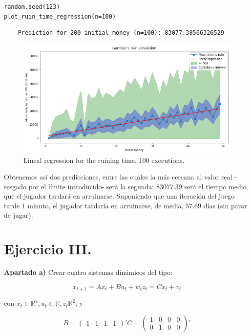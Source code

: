 \documentclass[a4paper]{article}
\newcommand{\R}{\mathbb{R}}
\begin{document}
\begin{verbatim}
random.seed(123)
plot_ruin_time_regression(n=100)
\end{verbatim}

\begin{verbatim}
	Prediction for 200 initial money (n=100): 83077.38566326529
\end{verbatim}

\begin{figure}[H]
	\includegraphics[scale=.6]{figures/gambler3_1}
	\centering
	\caption{Lineal regression for the ruining time, 100 executions.}
\end{figure}

Obtenemos así dos predicciones, entre las cuales la más cercana al valor real -sesgado por el límite introducido- será la segunda: $83077.39$ será el tiempo medio que el jugador tardará en arruinarse. Suponiendo que una iteración del juego tarde $1$ minuto, el jugador tardaría en arruinarse, de media, $57.69$ días (sin parar de jugar).

\section*{Ejercicio III.}

\textbf{Apartado a)} Crear cuatro sistemas dinámicos del tipo:

\[
	x_{t+1} = A x_t + B u_t + w_t
	z_t = C x_t + v_t
\]

con $x_t \in \R^4, u_t \in \R, z_t \R^2$, y

\[
	B = \begin{pmatrix} 1 & 1 & 1 & 1 \end{pmatrix}'
	C = \begin{pmatrix}
		1 & 0 & 0 & 0 \\
		0 & 1 & 0 & 0
	\end{pmatrix}'
\]
\end{document}
